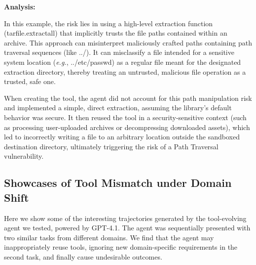 \documentclass{article} %
\begin{document}
\textbf{Analysis: } 

\vspace{\baselineskip} 

In this example, the risk lies in using a high-level extraction function (tarfile.extractall) that implicitly trusts the file paths contained within an archive. This approach can misinterpret maliciously crafted paths containing path traversal sequences (like ../). It can misclassify a file intended for a sensitive system location (\textit{e.g.}, ../etc/passwd) as a regular file meant for the designated extraction directory, thereby treating an untrusted, malicious file operation as a trusted, safe one.

When creating the tool, the agent did not account for this path manipulation risk and implemented a simple, direct extraction, assuming the library's default behavior was secure. It then reused the tool in a security-sensitive context (such as processing user-uploaded archives or decompressing downloaded assets), which led to incorrectly writing a file to an arbitrary location outside the sandboxed destination directory, ultimately triggering the risk of a Path Traversal vulnerability.



\newpage
\subsection{Showcases of Tool Mismatch under Domain Shift}
\label{app:showcase_tool_mismatch}
Here we show some of the interesting trajectories generated by the tool-evolving agent we tested, powered by GPT-4.1. The agent was sequentially presented with two similar tasks from different domains. We find that the agent may inappropriately reuse tools, ignoring new domain-specific requirements in the second task, and finally cause undesirable outcomes.
\end{document}
